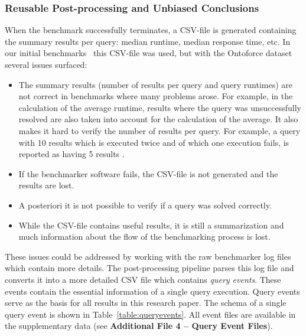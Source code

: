 \documentclass[twocolumn]{bmcart}%
\begin{document}
\subsubsection{Reusable Post-processing and Unbiased Conclusions}

When the benchmark successfully terminates, a CSV-file is generated containing the summary results per query: median runtime, median response time, etc.
In our initial benchmarks~\cite{de2016big} this CSV-file was used, but with the Ontoforce dataset several issues surfaced:

\begin{itemize}
	\item The summary results (number of results per query and query runtimes) are not correct in benchmarks where many problems arose. 
	For example, in the calculation of the average runtime, results where the query was unsuccessfully resolved are also taken into account for the calculation of the average. 
	It also makes it hard to verify the number of results per query. For example, a query with 10 results which is executed twice and of which one execution fails, is reported as having 5 results .
	\item If the benchmarker software fails, the CSV-file is not generated and the results are lost.
	\item A posteriori it is not possible to verify if a query was solved correctly.
	\item While the CSV-file contains useful results, it is still a summarization and much information about the flow of the benchmarking process is lost. 
\end{itemize}

These issues could be addressed by working with the raw benchmarker log files which contain more details.
The post-processing pipeline parses this log file and converts it into a more detailed CSV file which contains \emph{query events}. These events contain the essential information of a single query execution. Query events serve as the basis for all results in this research paper. The schema of a single query event is shown in Table~\ref{table:queryevents}. All event files are available in the supplementary data
(see \textbf{Additional File 4 -- Query Event Files}).
\end{document}
